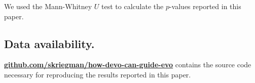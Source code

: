 We used the Mann-Whitney $U$ test to calculate the $p$-values reported in this paper.


\subsection{Data availability.}

\href{https://github.com/skriegman/how-devo-can-guide-evo}{\textbf{github.com/skriegman/how-devo-can-guide-evo}} contains the source code necessary for reproducing the results reported in this paper.





